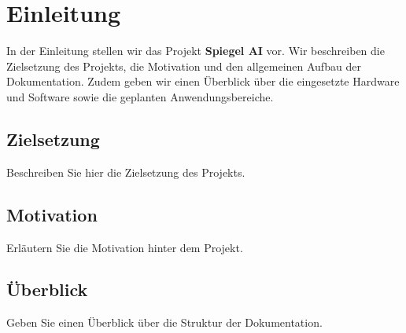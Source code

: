 \chapter*{Einleitung}

In der Einleitung stellen wir das Projekt \textbf{Spiegel AI} vor. Wir beschreiben die Zielsetzung des Projekts, die Motivation und den allgemeinen Aufbau der Dokumentation. Zudem geben wir einen Überblick über die eingesetzte Hardware und Software sowie die geplanten Anwendungsbereiche.

\section*{Zielsetzung}
Beschreiben Sie hier die Zielsetzung des Projekts.

\section*{Motivation}
Erläutern Sie die Motivation hinter dem Projekt.

\section*{Überblick}
Geben Sie einen Überblick über die Struktur der Dokumentation.

